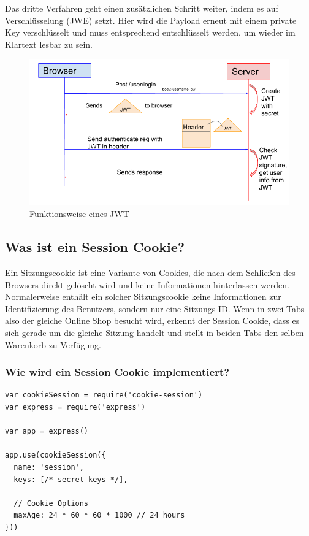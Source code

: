 Das dritte Verfahren geht einen zusätzlichen Schritt weiter, indem es auf Verschlüsselung (JWE) setzt. Hier wird die Payload erneut mit einem private Key verschlüsselt und muss entsprechend entschlüsselt werden, um wieder im Klartext lesbar zu sein.


\begin{figure}[h!]
    \centering
    \includegraphics[width=0.7\linewidth]{pics/jwt-funktion.png}
    \caption{Funktionsweise eines JWT}
    \label{fig:enter-label}
\end{figure}

\subsection{Was ist ein Session Cookie?}


Ein Sitzungscookie ist eine Variante von Cookies, die nach dem Schließen des Browsers direkt gelöscht wird und keine Informationen hinterlassen werden. Normalerweise enthält ein solcher Sitzungscookie keine Informationen zur Identifizierung des Benutzers, sondern nur eine Sitzungs-ID.
Wenn in zwei Tabs also der gleiche Online Shop besucht wird, erkennt der Session Cookie, dass es sich gerade um die gleiche Sitzung handelt und stellt in beiden Tabs den selben Warenkorb zu Verfügung.

\subsubsection{Wie wird ein Session Cookie implementiert?}

\begin{lstlisting}[caption=Implementierung Session Cookie]
var cookieSession = require('cookie-session')
var express = require('express')

var app = express()

app.use(cookieSession({
  name: 'session',
  keys: [/* secret keys */],

  // Cookie Options
  maxAge: 24 * 60 * 60 * 1000 // 24 hours
}))
\end{lstlisting}


